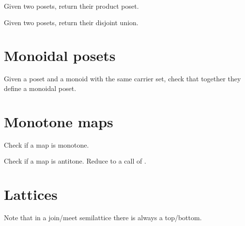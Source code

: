 \begin{exercise}
Given two posets, return their product poset.
\end{exercise}
\begin{exercise}
Given two posets, return their disjoint union.

\end{exercise}


\section{Monoidal posets}



\begin{exercise}
Given a poset and a monoid with the same carrier set, check that together they define a monoidal poset.

\end{exercise}


\section{Monotone maps}




\begin{exercise}
Check if a map is monotone.

\end{exercise}


\begin{exercise}
Check if a map is antitone. Reduce to a call of .

\end{exercise}


\section{Lattices}





Note that in a join/meet semilattice there is always a top/bottom.


